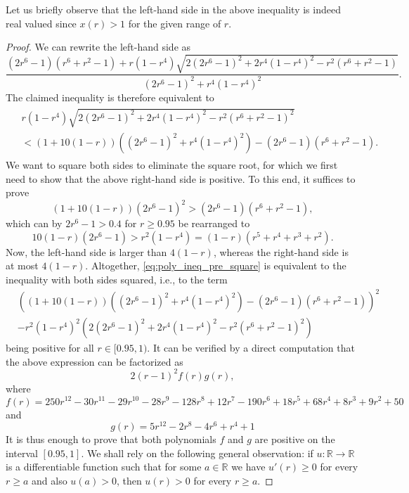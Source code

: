 \documentclass[12pt,a4paper]{article}
\theoremstyle{definition}
\newcommand\R{\mathbb{R}}
\begin{document}
Let us briefly observe that the left-hand side in the above inequality is indeed real valued since $x(r) > 1$ for the given range of $r$.



\begin{proof}
We can rewrite the left-hand side as
$$\frac{(2 r^6 - 1) (r^6 + r^2 - 1) + r (1 - r^4) \sqrt{2 \left( 2 r^6 - 1 \right)^2 + 2 r^4 (1 - r^4)^2 - r^2 (r^6 + r^2 - 1)}}{(2 r^6 - 1)^2 + r^4 (1 - r^4)^2}.$$
The claimed inequality is therefore equivalent to
\begin{align}
\begin{split}
\label{eq:poly_ineq_pre_square}
& r (1 - r^4) \sqrt{2 \left( 2 r^6 - 1 \right)^2 + 2 r^4 (1 - r^4)^2 - r^2 (r^6 + r^2 - 1)^2} \\
& < (1 + 10 (1 - r)) ((2 r^6 - 1)^2 + r^4 (1 - r^4)^2) - (2 r^6 - 1) (r^6 + r^2 - 1).
\end{split}
\end{align}
We want to square both sides to eliminate the square root, for which we first need to show that the above right-hand side is positive. To this end, it suffices to prove
$$ (1 + 10 (1 - r)) (2 r^6 - 1)^2 > (2 r^6 - 1) (r^6 + r^2 - 1), $$
which can by $2 r^6 - 1 > 0.4$ for $r \geq 0.95$ be rearranged to
$$ 10 (1 - r) (2 r^6 - 1) > r^2 (1 - r^4) = (1 - r) (r^5 + r^4 + r^3 + r^2). $$
Now, the left-hand side is larger than $4 (1-r)$, whereas the right-hand side is at most $4 (1-r)$. Altogether, \eqref{eq:poly_ineq_pre_square} is equivalent to the inequality with both sides squared, i.e., to the term
\begin{align*}
&\left( (1 + 10 (1 - r)) ((2 r^6 - 1)^2 + r^4 (1 - r^4)^2) - (2 r^6 - 1) (r^6 + r^2 - 1) \right)^2 \\
&- r^2 (1 - r^4)^2 \left( 2 (2 r^6 - 1)^2 + 2 r^4 (1 - r^4)^2 - r^2 (r^6 + r^2 - 1)^2 \right)
\end{align*}
being positive for all $r \in [0.95,1)$. It can be verified by a direct computation that the above expression can be factorized as
$$ 2 (r-1)^2 f(r) g(r),$$
where
$$ f(r) = 250 r^{12} - 30 r^{11} - 29 r^{10} - 28 r^9 - 128 r^8 + 12 r^7 - 190 r^6 + 18 r^5 + 68 r^4 + 8 r^3 + 9 r^2 + 50 $$
and
$$ g(r) = 5 r^{12} - 2 r^8 - 4 r^6 + r^4 + 1$$
It is thus enough to prove that both polynomials $f$ and $g$ are positive on the interval $[0.95, 1]$. We shall rely on the following general observation: if $u \colon \R \to \R$ is a differentiable function such that for some $a \in \R$ we have $u'(r) \geq 0$ for every $r \geq a$ and also $u(a) > 0$, then $u(r) > 0$ for every $r \geq a$.


\end{proof}
\end{document}
